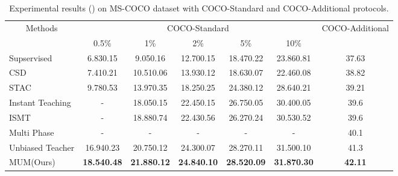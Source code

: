 \documentclass[10pt,twocolumn,letterpaper]{article}
\begin{document}
\begin{table*}[ht]
\caption{Experimental results () on MS-COCO dataset with COCO-Standard and COCO-Additional protocols. 
}
\centering
\begin{adjustbox}{width=0.9\textwidth}
\begin{tabular}{|l|ccccc|c|}
\hline
\multicolumn{1}{|c|}{\multirow{2}{*}{Methods}} & \multicolumn{5}{c|}{COCO-Standard}                                                                                                                                     & \multirow{2}{*}{COCO-Additional} \\
\multicolumn{1}{|c|}{}                         & 0.5\%                                          & 1\%                         & 2\%                         & 5\%                         & 10\%                        &                                  \\ \hline
Supservised                                    & {6.830.15} & 9.050.16  & 12.700.15 & 18.470.22 & 23.860.81 & 37.63                            \\
CSD\cite{jeong2019consistency}                                            & 7.410.21                     & 10.510.06 & 13.930.12 & 18.630.07 & 22.460.08 & 38.82                            \\
STAC\cite{sohn2020simple}                                           & 9.780.53                     & 13.970.35 & 18.250.25 & 24.380.12 & 28.640.21 & 39.21                            \\
Instant Teaching\cite{zhou2021instant}                               & -                                              & 18.050.15 & 22.450.15 & 26.750.05 & 30.400.05 & 39.6                             \\
ISMT\cite{yang2021interactive}                                           & -                                              & 18.880.74 & 22.430.56 & 26.270.24 & 30.530.52 & 39.6                             \\
Multi Phase\cite{wang2021data}                                    & -                                              & -                           & -                           & -                           & -                           & 40.1                             \\
Unbiased Teacher\cite{liu2021unbiased}                               & 16.940.23                    & 20.750.12 & 24.300.07 & 28.270.11 & 31.500.10   & 41.3                             \\ \hline
MUM(Ours)                                            & \textbf{18.540.48}                    & \textbf{21.880.12} & \textbf{24.840.10}  & \textbf{28.520.09} & \textbf{31.870.30}  & \textbf{42.11}                            \\ \hline
\end{tabular}
\end{adjustbox}
\label{tab:coco}
\end{table*}
\end{document}
